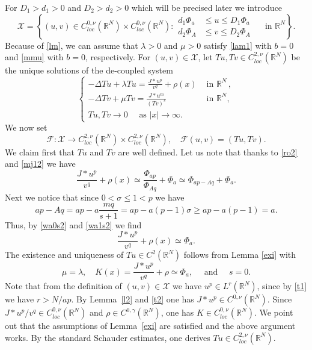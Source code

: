 \documentclass[leqno,12pt]{article}
\newcommand{\R}{\mathbb R}
\def\red#1{\textcolor{red}{#1}}
\numberwithin{equation}{section}
\begin{document}
For $D_1>d_1>0$ and $D_2>d_2>0$ which will be precised later we introduce
\[
\mathscr{X}=\left\{(u,v)\in C^{0,\nu}_{loc}(\R^N)\times C^{0,\nu}_{loc}(\R^N): 
\begin{aligned}
d_1 \Phi_{a} & \leq u\leq  D_1 \Phi_{a}\\
d_2 \Phi_{A} & \leq v\leq  D_2 \Phi_{A}
\end{aligned} \quad\mbox{ in }\R^N \right\}.
\]
Because of \eqref{lm}, we can assume that $\lambda>0$ and $\mu>0$ satisfy \eqref{lam1} with $b=0$ and \eqref{mmu} with $b=0$, respectively. 
For $(u,v)\in \mathscr{X}$, let $Tu, Tv\in C^{2, \nu}_{loc}(\R^N)$ be the unique solutions of the de-coupled system
\[
\begin{cases}
\displaystyle   -\Delta Tu+\lambda Tu=\frac{J * u^p}{v^q}+\rho(x) &\mbox{ in }\R^N\, ,\\[0.1in]
\displaystyle   -\Delta Tv+\mu Tv=\frac{J * u^m}{(Tv)^s} &\mbox{ in }\R^N,\\[0.1in]
Tu, Tv\to 0\quad \mbox{ as } |x|\to \infty.&
\end{cases}
\]
We now set
\begin{equation}\label{fx2}
\mathscr{F}:\mathscr{X}\to C^{2,\nu}_{loc}(\R^N)\times C^{2,\nu}_{loc}(\R^N),\quad \mathscr{F}(u,v)=(Tu, Tv).
\end{equation}
We claim first that $Tu$ and $Tv$ are well defined. Let us note that thanks to 
\eqref{ro2} and \eqref{mj12} we have
\begin{equation}\label{wa0s2}
\frac{J * u^p}{v^q}+\rho(x)\simeq \frac{\Phi_{ap}}{\Phi_{Aq}}+\Phi_{a}\simeq \Phi_{ap-Aq}+\Phi_{a}.
\end{equation}
Next we notice that since $0<\sigma\leq 1< p$ we have 
\begin{equation}\label{wa1s2}
ap-Aq=ap-a\frac{mq}{s+1}=ap-a(p-1)\sigma\geq ap-a(p-1)=a.
\end{equation}
Thus, by \eqref{wa0s2} and \eqref{wa1s2} we find
$$
\frac{J * u^p}{v^q}+\rho(x)\simeq \Phi_{a}.
$$
The existence and uniqueness of $Tu\in C^{2}(\R^N)$ follows from 
Lemma \ref{exi} with 
$$
\mu=\lambda, \quad K(x)=\frac{J * u^p}{v^q}+\rho\simeq \Phi_{a},\quad\mbox{  and }\quad s=0.
$$ 
Note that from the definition of $(u, v)\in \mathscr{X}$
we have $u^p\in L^r(\R^N)$, since by \eqref{t1} we have $r>N/ap$.
By Lemma~\ref{l2} and \eqref{t2} one has $J * u^p\in C^{0,\nu}(\R^N)$.
Since $J*u^p/v^q\in C^{0,\nu}_{loc}(\R^N)$ and $\rho\in C^{0,\gamma}(\R^N)$, one has $K\in C^{0,\nu}_{loc}(\R^N)$.
We point out that the assumptions of Lemma~\ref{exi} are satisfied and the above argument works.
By the standard Schauder estimates, one derives $Tu\in C^{2, \nu}_{loc}(\R^N)$. 
\end{document}
